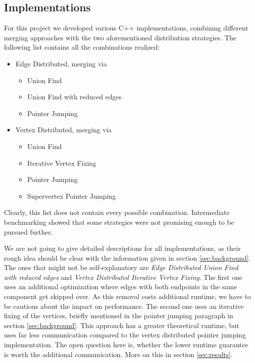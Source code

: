 \documentclass[letterpaper]{article}
\begin{document}
\subsection{Implementations}
\label{sec:implementations}
For this project we developed various C++ implementations, combining different merging approaches with the two
aforementioned distribution strategies. The following list contains all the combinations realized:
\begin{itemize}
  \item Edge Distributed, merging via
  \begin{itemize}
     \item Union Find 
     \item Union Find with reduced edges
     \item Pointer Jumping
  \end{itemize}
  \item Vertex Distributed, merging via
  \begin{itemize}
     \item Union Find 
     \item Iterative Vertex Fixing
     \item Pointer Jumping
     \item Supervertex Pointer Jumping
  \end{itemize}
\end{itemize}
Clearly, this list does not contain every possible combination. Intermediate benchmarking showed that some strategies
were not promising enough to be pursued further.

We are not going to give detailed descriptions for all implementations, as their rough idea should be clear with the
information given in section \ref{sec:background}. The ones that might not be self-explanatory are \emph{Edge
Distributed Union Find with reduced edges} and \emph{Vertex Distributed Iterative Vertex Fixing}. The first one uses
an additional optimization where edges with both endpoints in the same component get skipped over. As this removal costs
additional runtime, we have to be cautious about the impact on performance. The second one uses an iterative fixing of
the vertices, briefly mentioned in the pointer jumping paragraph in section \ref{sec:background}. This approach has a
greater theoretical runtime, but uses far less communication compared to the vertex distributed pointer jumping
implementation. The open question here is, whether the lower runtime guarantee is worth the additional communication.
More on this in section \ref{sec:results}.
\end{document}
